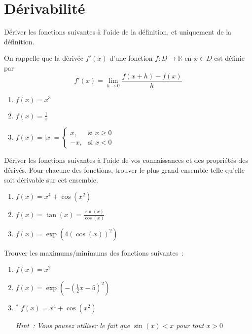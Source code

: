 
\part{Dérivabilité}
\begin{exercice}
Dériver les fonctions suivantes à l'aide de la définition, et uniquement de la définition.

On rappelle que la dérivée $f'(x)$ d'une fonction $f : D \to \mathbb{R}$ en $x \in D$ est définie par
\[
f'(x) = \lim_{h \to 0} \frac{f(x + h) - f(x)}{h}
\]
\begin{enumerate}
    \item $f(x) = x^3$
    \item $f(x) = \frac{1}{x}$
    \item $f(x) = |x| = \begin{cases} x, & \text{si } x \geq 0 \\ -x, & \text{si } x < 0 \end{cases}$
\end{enumerate}
\end{exercice}

\vspace{5mm}

\begin{exercice}
Dériver les fonctions suivantes à l'aide de vos connaissances et des propriétés des dérivés. Pour chacune des fonctions, trouver le plus grand ensemble telle qu'elle soit dérivable sur cet ensemble.

\begin{enumerate}
    \item $f(x) = x^4 + \cos(x^2)$
    \item $f(x) = \tan(x) = \frac{\sin(x)}{\cos(x)}$
    \item $f(x) = \exp(4 (\cos(x))^2)$
\end{enumerate}
\end{exercice}

\begin{exercice}[Extremums]
Trouver les maximums/minimums des fonctions suivantes~:
\begin{enumerate}
    \item $f(x) = x^2$
    \item $f(x) = \exp \left( -(\frac{1}{2}x - 5)^2 \right)$
    \item $\!\!\!\!{^*}$ $f(x) = x^4 + \cos(x^2)$
    
    \emph{Hint~: Vous pouvez utiliser le fait que $\sin(x) < x$ pour tout $x > 0$}
\end{enumerate}
\end{exercice}